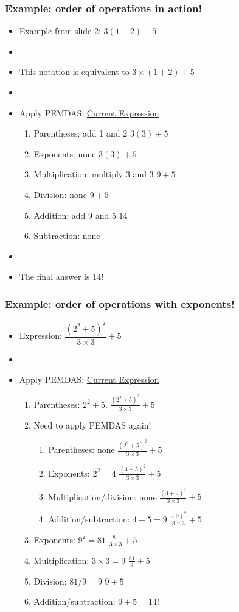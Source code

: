 \documentclass[11pt]{beamer}
\newcommand{\myframe}[1]{\begin{frame} \frametitle{#1}}
\begin{document}
\myframe{Example: order of operations in action!}
\begin{itemize}
\item Example from slide 2: $3(1 + 2) + 5$
\item[]
\item This notation is equivalent to $3\times (1+2) + 5$
\item[]
\item Apply PEMDAS: \hfill \underline{Current Expression}
\begin{enumerate}
\item Parentheses: add 1 and 2 \hfill $3(3) + 5$
\item Exponents: none \hfill $3(3) + 5$
\item Multiplication: multiply 3 and 3 \hfill $9 + 5$
\item Division: none \hfill $9 + 5$
\item Addition: add 9 and 5 \hfill 14
\item Subtraction: none
\end{enumerate}
\item[]
\item The final answer is 14!
\end{itemize}
\end{frame}

\myframe{Example: order of operations with exponents!}
\begin{itemize}
\item Expression: $\dfrac{(2^2 + 5)^2}{3\times 3} + 5$
\item[]
\item Apply PEMDAS: \hfill \underline{Current Expression}
\begin{enumerate}
\item Parentheses: $2^2 + 5$. \hfill $\frac{(2^2 + 5)^2}{3\times 3} + 5$
\item[] Need to apply PEMDAS again!
\begin{enumerate}
\item Parentheses: none \hfill $\frac{(2^2 + 5)^2}{3\times 3} + 5$
\item Exponents: $2^2 = 4$ \hfill $\frac{(4 + 5)^2}{3\times 3} + 5$
\item Multiplication/division: none \hfill $\frac{(4 + 5)^2}{3\times 3} + 5$
\item Addition/subtraction: $4 + 5 = 9$ \hfill $\frac{(9)^2}{3\times 3} + 5$
\end{enumerate}
\item Exponents: $9^2 = 81$ \hfill $\frac{81}{3\times 3} + 5$
\item Multiplication: $3 \times 3 = 9$ \hfill $\frac{81}{9} + 5$
\item Division: $81/9 = 9$ \hfill $9 + 5$
\item Addition/subtraction: $9 + 5 = 14$!
\end{enumerate}
\end{itemize}
\end{frame}
\end{document}
